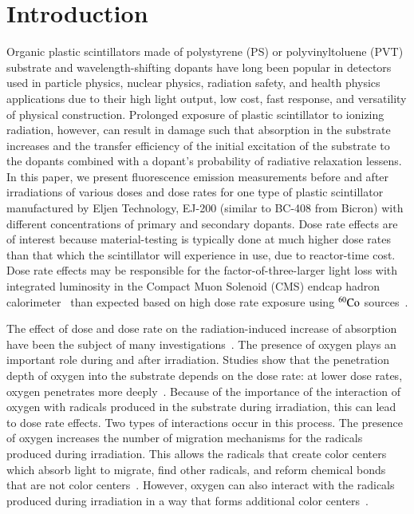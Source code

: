 \documentclass[preprint]{elsarticle}
\begin{document}

\section{Introduction}
Organic plastic scintillators made of polystyrene (PS) or polyvinyltoluene (PVT) substrate and wavelength-shifting dopants have 
long been popular in detectors used in particle physics, nuclear physics, radiation safety, and health physics applications 
due to their high light output, low cost, fast response, and versatility of physical construction. 
Prolonged exposure of plastic scintillator to ionizing radiation, however, can result in damage such that
absorption in the substrate increases and the transfer efficiency of the initial excitation of the substrate to the dopants
combined with a dopant's probability of radiative relaxation lessens. 
In this paper, we present fluorescence emission measurements before and after irradiations of various doses and 
dose rates for one type of plastic scintillator manufactured by Eljen Technology, EJ-200 (similar to BC-408 from Bicron) 
with different concentrations of primary and secondary dopants.
Dose rate effects are of interest because material-testing is typically done at much higher dose rates than 
that which the scintillator will experience in use, due to reactor-time cost.
Dose rate effects may be responsible for the factor-of-three-larger light loss with integrated luminosity 
in the Compact Muon Solenoid (CMS) endcap hadron calorimeter~\cite{phaseiitdr,ecfa2015} than expected based on high dose rate exposure 
using $\rm {^{60}Co}$ sources~\cite{vasken,ByonWagner1993263}. 

The effect of dose and dose rate on the radiation-induced increase of absorption have been the subject of many investigations~\cite{sauli}.
The presence of oxygen plays an important role during and after irradiation.
Studies show that the penetration depth of oxygen into the substrate depends on the dose rate: 
at lower dose rates, oxygen penetrates more deeply~\cite{sauli,Wick1991472,Wick2001341}. 
Because of the importance of the interaction of oxygen with radicals produced in the substrate during irradiation, 
this can lead to dose rate effects. Two types of interactions occur in this process. 
The presence of oxygen increases the number of migration mechanisms for the radicals produced during irradiation. 
This allows the radicals that create color centers which absorb light to migrate, find other radicals, 
and reform chemical bonds that are not color centers~\cite{Wulkop1995141}.
However, oxygen can also interact with the radicals produced during irradiation in a way 
that forms additional color centers~\cite{bross19921199}. 
\end{document}
